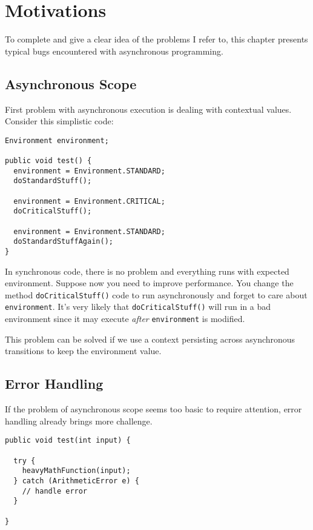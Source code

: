
\chapter{Motivations}
\label{ch:motiv}
To complete and give a clear idea of the problems I refer to, this chapter presents typical bugs encountered with asynchronous programming.

\section{Asynchronous Scope}

First problem with asynchronous execution is dealing with contextual values. Consider this simplistic code:

\begin{lstlisting}
Environment environment;

public void test() {
  environment = Environment.STANDARD;
  doStandardStuff();

  environment = Environment.CRITICAL;
  doCriticalStuff();

  environment = Environment.STANDARD;
  doStandardStuffAgain();
}
\end{lstlisting}

In synchronous code, there is no problem and everything runs with expected environment. Suppose now you need to improve performance. You change the method \lstinline{doCriticalStuff()} code to run asynchronously and forget to care about \lstinline{environment}. It's very likely that \lstinline{doCriticalStuff()} will run in a bad environment since it may execute \emph{after} \lstinline{environment} is modified.


This problem can be solved if we use a context persisting across asynchronous transitions to keep the environment value.


\section{Error Handling}

If the problem of asynchronous scope seems too basic to require attention, error handling already brings more challenge.

\begin{lstlisting}
public void test(int input) {
  
  try {
    heavyMathFunction(input);
  } catch (ArithmeticError e) {
    // handle error
  }

}
\end{lstlisting}

